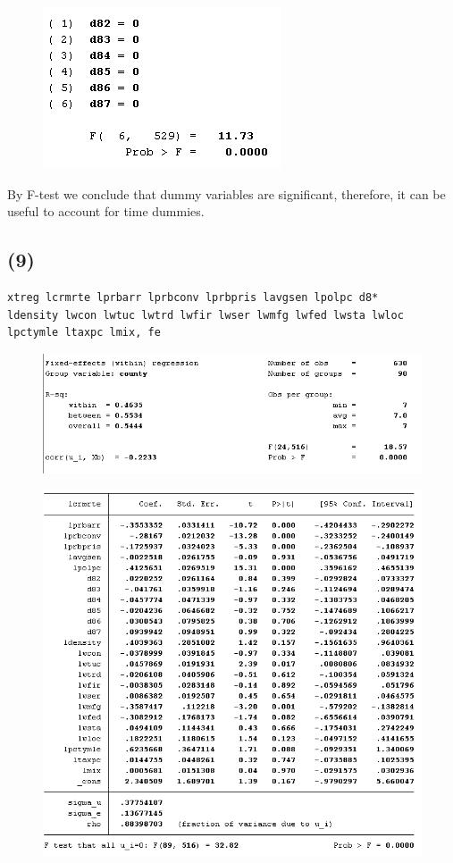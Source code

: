 \documentclass[12pt,a4paper, oneside]{extreport}
\begin{document}
\begin{figure}[H]
	\centering
	\includegraphics[width=0.35\linewidth]{screenshot030}
	\label{fig:screenshot001}
\end{figure}

By F-test we conclude that dummy variables are significant, therefore, it can be useful to account for time dummies. 


\subsection*{(9)}


\begin{verbatim}
xtreg lcrmrte lprbarr lprbconv lprbpris lavgsen lpolpc d8* 
ldensity lwcon lwtuc lwtrd lwfir lwser lwmfg lwfed lwsta lwloc 
lpctymle ltaxpc lmix, fe
\end{verbatim}



\begin{figure}[H]
	\centering
	\includegraphics[width=0.9\linewidth]{screenshot031}
	\label{fig:screenshot001}
\end{figure}




\begin{figure}[H]
	\centering
	\includegraphics[width=0.7\linewidth]{screenshot032}
	\label{fig:screenshot001}
\end{figure}
\end{document}
